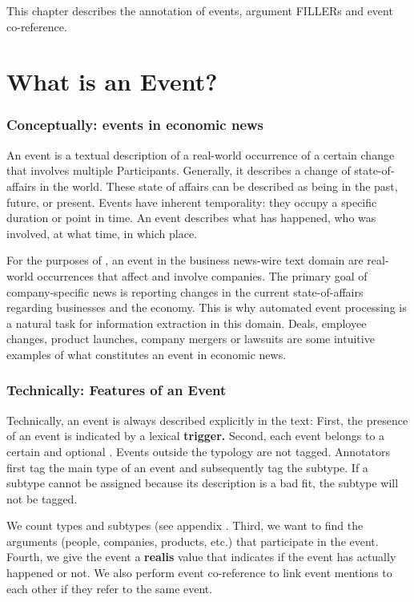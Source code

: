 This chapter describes the annotation of events, argument FILLERs and event co-reference.

\section{What is an Event?}

\subsubsection{Conceptually: events in economic news}

An event is a textual description of a real-world occurrence of a certain change that involves multiple Participants.
Generally, it describes a change of state-of-affairs in the world.
These state of affairs can be described as being in the past, future, or present.
Events have inherent temporality: they occupy a specific duration or point in time.
An event describes what has happened, who was involved, at what time, in which place.

For the purposes of \project, an event in the business news-wire text domain are real-world occurrences that affect and involve companies.
The primary goal of company-specific news is reporting changes in the current state-of-affairs regarding businesses and the economy.
This is why automated event processing is a natural task for information extraction in this domain.
Deals, employee changes, product launches, company mergers or lawsuits are some intuitive examples of what constitutes an event in economic news. 

\subsubsection{Technically: Features of an Event}

Technically, an event is always described explicitly in the text:
First, the presence of an event is indicated by a lexical \textbf{trigger.}
Second, each event belongs to a certain  and optional .
Events outside the typology are not tagged.
Annotators first tag the main type of an event and subsequently tag the subtype.
If a subtype cannot be assigned because its description is a bad fit, the subtype will not be tagged.

We count \typecount types and \subtypecount subtypes (see appendix . 
Third, we want to find the arguments (people, companies, products, etc.) that participate in the event.
Fourth, we give the event a \textbf{realis} value that indicates if the event has actually happened or not.
We also perform event co-reference to link event mentions to each other if they refer to the same event.

